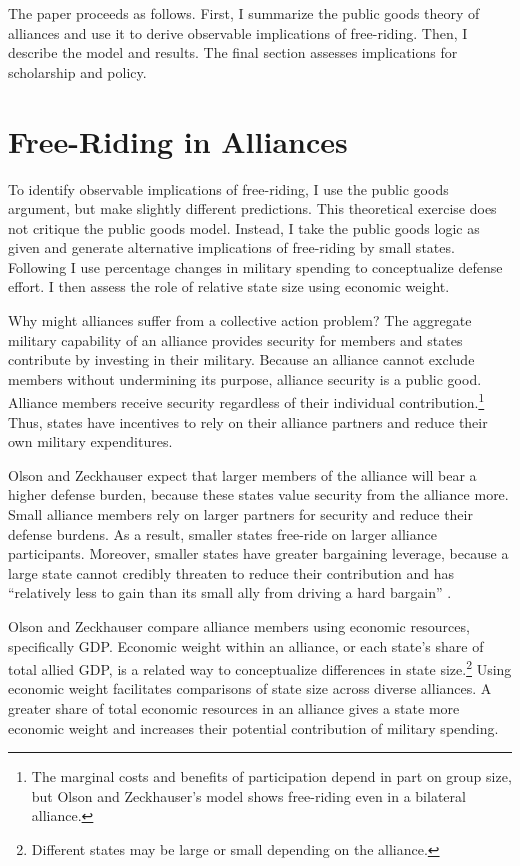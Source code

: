 \documentclass[12pt]{article}
\begin{document}
The paper proceeds as follows.
First, I summarize the public goods theory of alliances and use it to derive observable implications of free-riding.
Then, I describe the model and results. 
The final section assesses implications for scholarship and policy. 



\section{Free-Riding in Alliances}

To identify observable implications of free-riding, I use the public goods argument, but make slightly different predictions.
This theoretical exercise does not critique the public goods model.
Instead, I take the public goods logic as given and generate alternative implications of free-riding by small states. 
Following \citet{PluemperNeumayer2015} I use percentage changes in military spending to conceptualize defense effort.
I then assess the role of relative state size using economic weight. 


Why might alliances suffer from a collective action problem?
The aggregate military capability of an alliance provides security for members and states contribute by investing in their military.
Because an alliance cannot exclude members without undermining its purpose, alliance security is a public good. 
Alliance members receive security regardless of their individual contribution.\footnote{The marginal costs and benefits of participation depend in part on group size, but Olson and Zeckhauser's model shows free-riding even in a bilateral alliance.}
Thus, states have incentives to rely on their alliance partners and reduce their own military expenditures.  

 
Olson and Zeckhauser expect that larger members of the alliance will bear a higher defense burden, because these states value security from the alliance more.
Small alliance members rely on larger partners for security and reduce their defense burdens.
As a result, smaller states free-ride on larger alliance participants. 
Moreover, smaller states have greater bargaining leverage, because a large state cannot credibly threaten to reduce their contribution and has ``relatively less to gain than its small ally from driving a hard bargain'' \citep[pg. 274]{OlsonZeckhauser1966}. 


Olson and Zeckhauser compare alliance members using economic resources, specifically GDP.
Economic weight within an alliance, or each state's share of total allied GDP, is a related way to conceptualize differences in state size.\footnote{Different states may be large or small depending on the alliance.} 
Using economic weight facilitates comparisons of state size across diverse alliances. 
A greater share of total economic resources in an alliance gives a state more economic weight and increases their potential contribution of military spending. 
\end{document}
